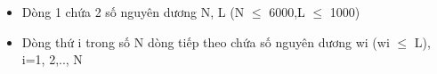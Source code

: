 \begin{itemize}
	\item     Dòng 1 chứa 2 số nguyên dương N, L (N $\le$ 6000,L $\le$ 1000)   
	\item     Dòng thứ i trong số N dòng tiếp theo chứa số nguyên dương wi (wi $\le$ L), i=1, 2,.., N   
\end{itemize}

\